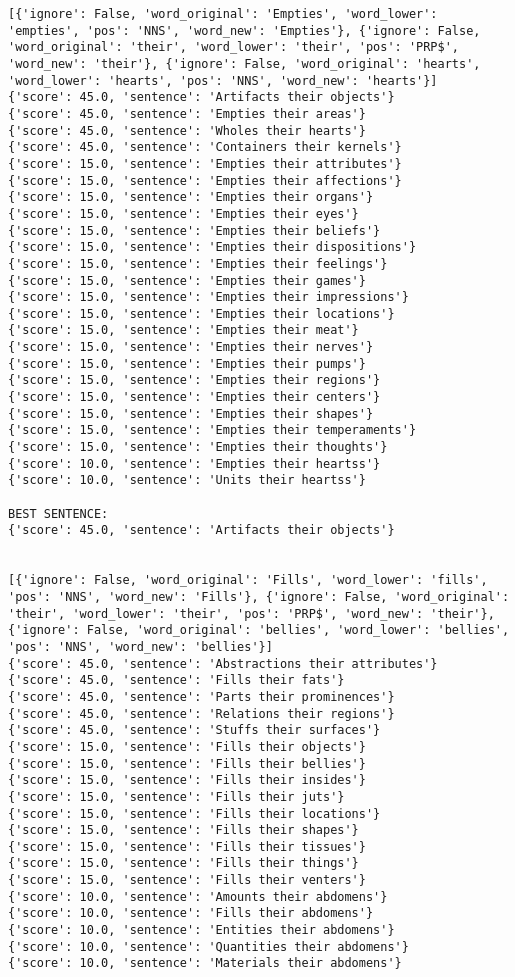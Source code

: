 \documentclass[12pt,a4paper,oneside]{book}
\begin{document}
\begin{verbatim}
[{'ignore': False, 'word_original': 'Empties', 'word_lower': 'empties', 'pos': 'NNS', 'word_new': 'Empties'}, {'ignore': False, 'word_original': 'their', 'word_lower': 'their', 'pos': 'PRP$', 'word_new': 'their'}, {'ignore': False, 'word_original': 'hearts', 'word_lower': 'hearts', 'pos': 'NNS', 'word_new': 'hearts'}]
{'score': 45.0, 'sentence': 'Artifacts their objects'}
{'score': 45.0, 'sentence': 'Empties their areas'}
{'score': 45.0, 'sentence': 'Wholes their hearts'}
{'score': 45.0, 'sentence': 'Containers their kernels'}
{'score': 15.0, 'sentence': 'Empties their attributes'}
{'score': 15.0, 'sentence': 'Empties their affections'}
{'score': 15.0, 'sentence': 'Empties their organs'}
{'score': 15.0, 'sentence': 'Empties their eyes'}
{'score': 15.0, 'sentence': 'Empties their beliefs'}
{'score': 15.0, 'sentence': 'Empties their dispositions'}
{'score': 15.0, 'sentence': 'Empties their feelings'}
{'score': 15.0, 'sentence': 'Empties their games'}
{'score': 15.0, 'sentence': 'Empties their impressions'}
{'score': 15.0, 'sentence': 'Empties their locations'}
{'score': 15.0, 'sentence': 'Empties their meat'}
{'score': 15.0, 'sentence': 'Empties their nerves'}
{'score': 15.0, 'sentence': 'Empties their pumps'}
{'score': 15.0, 'sentence': 'Empties their regions'}
{'score': 15.0, 'sentence': 'Empties their centers'}
{'score': 15.0, 'sentence': 'Empties their shapes'}
{'score': 15.0, 'sentence': 'Empties their temperaments'}
{'score': 15.0, 'sentence': 'Empties their thoughts'}
{'score': 10.0, 'sentence': 'Empties their heartss'}
{'score': 10.0, 'sentence': 'Units their heartss'}

BEST SENTENCE:
{'score': 45.0, 'sentence': 'Artifacts their objects'}


[{'ignore': False, 'word_original': 'Fills', 'word_lower': 'fills', 'pos': 'NNS', 'word_new': 'Fills'}, {'ignore': False, 'word_original': 'their', 'word_lower': 'their', 'pos': 'PRP$', 'word_new': 'their'}, {'ignore': False, 'word_original': 'bellies', 'word_lower': 'bellies', 'pos': 'NNS', 'word_new': 'bellies'}]
{'score': 45.0, 'sentence': 'Abstractions their attributes'}
{'score': 45.0, 'sentence': 'Fills their fats'}
{'score': 45.0, 'sentence': 'Parts their prominences'}
{'score': 45.0, 'sentence': 'Relations their regions'}
{'score': 45.0, 'sentence': 'Stuffs their surfaces'}
{'score': 15.0, 'sentence': 'Fills their objects'}
{'score': 15.0, 'sentence': 'Fills their bellies'}
{'score': 15.0, 'sentence': 'Fills their insides'}
{'score': 15.0, 'sentence': 'Fills their juts'}
{'score': 15.0, 'sentence': 'Fills their locations'}
{'score': 15.0, 'sentence': 'Fills their shapes'}
{'score': 15.0, 'sentence': 'Fills their tissues'}
{'score': 15.0, 'sentence': 'Fills their things'}
{'score': 15.0, 'sentence': 'Fills their venters'}
{'score': 10.0, 'sentence': 'Amounts their abdomens'}
{'score': 10.0, 'sentence': 'Fills their abdomens'}
{'score': 10.0, 'sentence': 'Entities their abdomens'}
{'score': 10.0, 'sentence': 'Quantities their abdomens'}
{'score': 10.0, 'sentence': 'Materials their abdomens'}


\end{verbatim}
\end{document}
